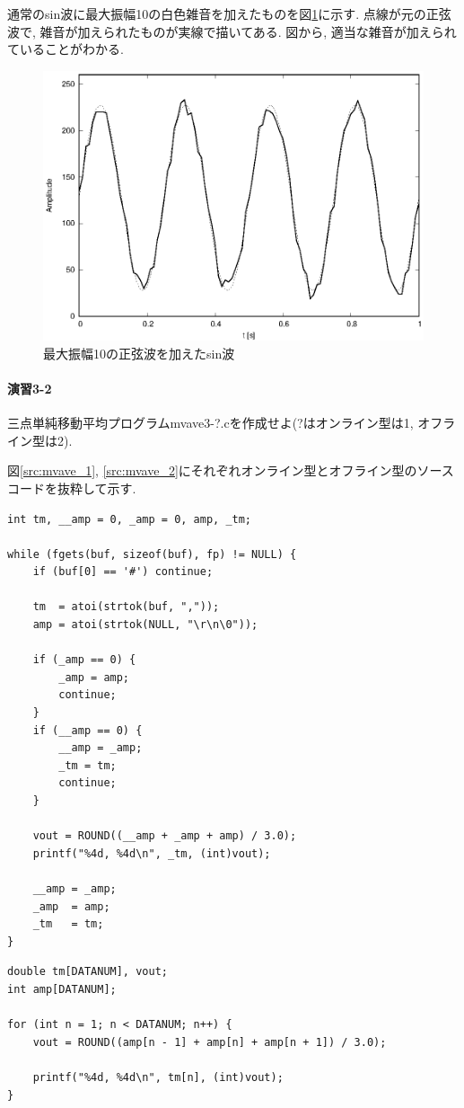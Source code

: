 \documentclass[titlepage]{jsarticle}
\begin{document}
        通常のsin波に最大振幅10の白色雑音を加えたものを図\ref{fig:sin_wn}に示す.
        点線が元の正弦波で, 雑音が加えられたものが実線で描いてある.
        図から, 適当な雑音が加えられていることがわかる.

        \begin{figure}[ht]
            \centering
            \includegraphics[width=12cm]{images/sin_wn.eps}
            \caption{最大振幅10の正弦波を加えたsin波}
            \label{fig:sin_wn}
        \end{figure}

    \paragraph{演習3-2} 三点単純移動平均プログラムmvave3-?.cを作成せよ(?はオンライン型は1,
    オフライン型は2).

        図\ref{src:mvave_1}, \ref{src:mvave_2}にそれぞれオンライン型とオフライン型のソースコードを抜粋して示す.

        \begin{lstlisting}[caption=mvave3-1.c, label=src:mvave_1]
int tm, __amp = 0, _amp = 0, amp, _tm;

while (fgets(buf, sizeof(buf), fp) != NULL) {
    if (buf[0] == '#') continue;
    
    tm  = atoi(strtok(buf, ","));
    amp = atoi(strtok(NULL, "\r\n\0"));

    if (_amp == 0) {
        _amp = amp;
        continue;
    }
    if (__amp == 0) {
        __amp = _amp;
        _tm = tm;
        continue;
    }

    vout = ROUND((__amp + _amp + amp) / 3.0);
    printf("%4d, %4d\n", _tm, (int)vout);

    __amp = _amp;
    _amp  = amp;
    _tm   = tm;
}
        \end{lstlisting}
        \begin{lstlisting}[caption=mvave3-2.c, label=src:mvave_2]
double tm[DATANUM], vout;
int amp[DATANUM];

for (int n = 1; n < DATANUM; n++) {
    vout = ROUND((amp[n - 1] + amp[n] + amp[n + 1]) / 3.0);

    printf("%4d, %4d\n", tm[n], (int)vout);
}
        \end{lstlisting}
\end{document}
